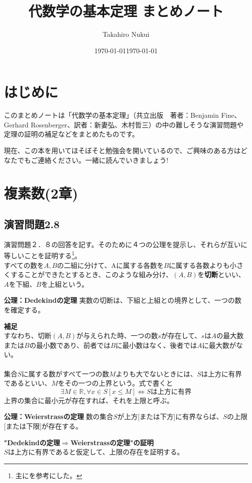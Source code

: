 \documentclass[10pt]{jarticle}
\title{代数学の基本定理 まとめノート}
\author{Takahiro Nukui}
\date{\today}
\begin{document}
\maketitle
\tableofcontents

\newpage

\section{はじめに}
このまとめノートは「代数学の基本定理」（共立出版　著者：Benjamin Fine、Gerhard Rosenberger、訳者：新妻弘、木村哲三）の中の難しそうな演習問題や定理の証明の補足などをまとめたものです。\date{\today}現在、この本を用いてほそぼそと勉強会を開いているので、ご興味のある方はどなたでもご連絡ください。一緒に読んでいきましょう!

\newpage


\section{複素数(2章)}
\subsection{演習問題2.8}
演習問題２．８の回答を記す。そのために４つの公理を提示し、それらが互いに等しいことを証明する\footnote{主に\cite{高木}を参考にした。}。\\


 すべての数を$A,B$の二組に分けて、Aに属する各数を$B$に属する各数よりも小さくすることができたとするとき、このような組み分け、$(A,B)$を\textbf{切断}といい、$A$を下組、$B$を上組という。
\begin{itembox}[l]{\textbf{公理：Dedekindの定理}}
実数の切断は、下組と上組との境界として、一つの数を確定する。
\end{itembox}
\textbf{補足}\\
すなわち、切断$(A,B)$が与えられた時、一つの数$s$が存在して、$s$は$A$の最大数または$B$の最小数であり、前者では$B$に最小数はなく、後者では$A$に最大数がない。
\\
\\


集合$S$に属する数がすべて一つの数$M$よりも大でないときには、$S$は上方に有界であるといい、$M$をその一つの上界という。式で書くと
\[\exists M\in\mathbb{R},\forall x\in S[x\leq M] \Longleftrightarrow Sは上方に有界\]
上界の集合に最小元が存在すれば、それを上限と呼ぶ。
\begin{itembox}[l]{\textbf{公理：Weierstrassの定理}}
数の集合$S$が上方[または下方]に有界ならば、$S$の上限[または下限]が存在する。
\end{itembox}
\textbf{"Dedekindの定理$\Longrightarrow$Weierstrassの定理"の証明}\\
$S$は上方に有界であると仮定して、上限の存在を証明する。
\end{document}
